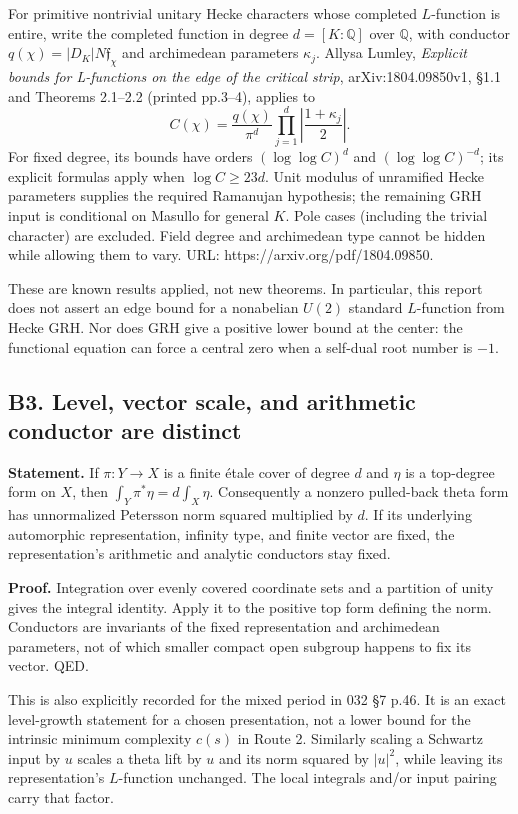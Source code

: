 For primitive nontrivial unitary Hecke characters whose completed \(L\)-function is entire, write the completed function in degree \(d=[K:\mathbb Q]\) over \(\mathbb Q\), with conductor \(q(\chi)=|D_K|N\mathfrak f_\chi\) and archimedean parameters \(\kappa_j\). Allysa Lumley, \emph{Explicit bounds for L-functions on the edge of the critical strip}, arXiv:1804.09850v1, §1.1 and Theorems 2.1--2.2 (printed pp.3--4), applies to \[
 C(\chi)=\frac{q(\chi)}{\pi^d}\prod_{j=1}^d\left|\frac{1+\kappa_j}{2}\right|.
\] For fixed degree, its bounds have orders \((\log\log C)^{d}\) and \((\log\log C)^{-d}\); its explicit formulas apply when \(\log C\geq23d\). Unit modulus of unramified Hecke parameters supplies the required Ramanujan hypothesis; the remaining GRH input is conditional on Masullo for general \(K\). Pole cases (including the trivial character) are excluded. Field degree and archimedean type cannot be hidden while allowing them to vary. URL: https://arxiv.org/pdf/1804.09850.

These are known results applied, not new theorems. In particular, this report does not assert an edge bound for a nonabelian \(U(2)\) standard \(L\)-function from Hecke GRH. Nor does GRH give a positive lower bound at the center: the functional equation can force a central zero when a self-dual root number is \(-1\).

\subsection{B3. Level, vector scale, and arithmetic conductor are distinct}\label{b3.-level-vector-scale-and-arithmetic-conductor-are-distinct}

\textbf{Statement.} If \(\pi:Y\to X\) is a finite étale cover of degree \(d\) and \(\eta\) is a top-degree form on \(X\), then \(\int_Y\pi^*\eta=d\int_X\eta\). Consequently a nonzero pulled-back theta form has unnormalized Petersson norm squared multiplied by \(d\). If its underlying automorphic representation, infinity type, and finite vector are fixed, the representation's arithmetic and analytic conductors stay fixed.

\textbf{Proof.} Integration over evenly covered coordinate sets and a partition of unity gives the integral identity. Apply it to the positive top form defining the norm. Conductors are invariants of the fixed representation and archimedean parameters, not of which smaller compact open subgroup happens to fix its vector. QED.

This is also explicitly recorded for the mixed period in 032 §7 p.46. It is an exact level-growth statement for a chosen presentation, not a lower bound for the intrinsic minimum complexity \(c(s)\) in Route 2. Similarly scaling a Schwartz input by \(u\) scales a theta lift by \(u\) and its norm squared by \(|u|^2\), while leaving its representation's \(L\)-function unchanged. The local integrals and/or input pairing carry that factor.


